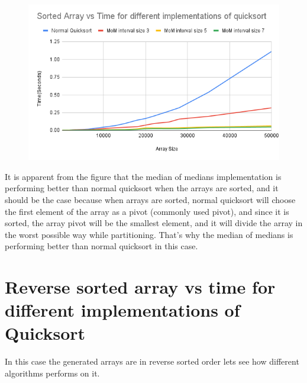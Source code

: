 \documentclass{report}
\begin{document}
\begin{figure}[H]
\centering
\includegraphics[scale=0.6]{sortedvstime.png}

\end{figure}

It is apparent from the figure that the median of medians implementation is performing better than normal quicksort when the arrays are sorted, and it should be the case because when arrays are sorted, normal quicksort will choose the first element of the array as a pivot (commonly used pivot), and since it is sorted, the array pivot will be the smallest element, and it will divide the array in the worst possible way while partitioning. That's why the median of medians is performing better than normal quicksort in this case.

\newpage
\section*{Reverse sorted array vs time for different implementations of Quicksort}

In this case the generated arrays are in reverse sorted order lets see how different algorithms performs on it.
\end{document}
